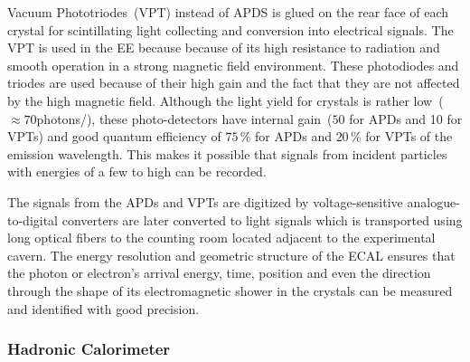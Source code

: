 Vacuum Phototriodes~(VPT) instead of APDS is glued on the rear face of each crystal for scintillating light collecting and conversion into electrical signals. The VPT is used in the \textsc{EE} because  because of its high resistance to radiation and smooth operation in a strong magnetic field environment. These photodiodes and triodes are used because of their high gain and the fact that they are not affected by the high magnetic field. Although the light yield for \pb crystals is rather low~($\approx 70$photons/\MeV), these photo-detectors have internal gain~($50$ for APDs and 10 for VPTs) and good quantum efficiency of $75$\,\% for APDs and $20$\,\% for VPTs of the emission wavelength. This makes it possible that signals from incident particles with energies of a few to high \GeV can be recorded.
 
The signals from the APDs and VPTs are digitized by voltage-sensitive analogue-to-digital converters are later converted to light signals which is transported using long optical fibers to the counting room located adjacent to the experimental cavern.
\newline
The energy resolution and geometric structure of the ECAL ensures that the photon or electron's arrival energy, time, position and even the direction through the shape of its electromagnetic shower in the crystals can be measured and identified with good precision.

\subsubsection{Hadronic Calorimeter}

